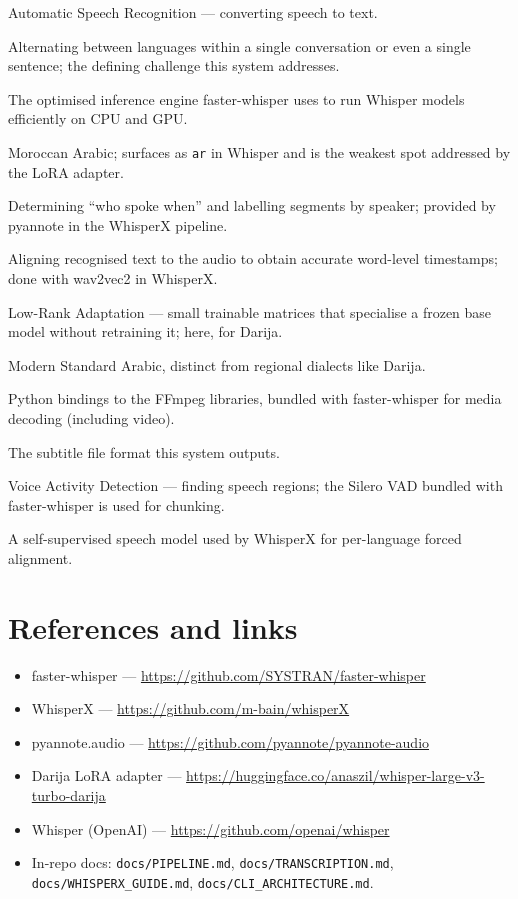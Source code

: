 \documentclass[11pt,a4paper]{report}
\newcommand{\code}[1]{\texttt{\small #1}}
\begin{document}
\begin{description}[leftmargin=2em,style=nextline]
  \item[ASR] Automatic Speech Recognition --- converting speech to text.
  \item[Code-switching] Alternating between languages within a single
        conversation or even a single sentence; the defining challenge this system
        addresses.
  \item[CTranslate2] The optimised inference engine faster-whisper uses to run
        Whisper models efficiently on CPU and GPU.
  \item[Darija] Moroccan Arabic; surfaces as \code{ar} in Whisper and is the
        weakest spot addressed by the LoRA adapter.
  \item[Diarization] Determining ``who spoke when'' and labelling segments by
        speaker; provided by pyannote in the WhisperX pipeline.
  \item[Forced alignment] Aligning recognised text to the audio to obtain accurate
        word-level timestamps; done with wav2vec2 in WhisperX.
  \item[LoRA] Low-Rank Adaptation --- small trainable matrices that specialise a
        frozen base model without retraining it; here, for Darija.
  \item[MSA] Modern Standard Arabic, distinct from regional dialects like Darija.
  \item[PyAV] Python bindings to the FFmpeg libraries, bundled with faster-whisper
        for media decoding (including video).
  \item[SRT / SubRip] The subtitle file format this system outputs.
  \item[VAD] Voice Activity Detection --- finding speech regions; the Silero VAD
        bundled with faster-whisper is used for chunking.
  \item[wav2vec2] A self-supervised speech model used by WhisperX for per-language
        forced alignment.
\end{description}

\section{References and links}

\begin{itemize}[leftmargin=1.6em]
  \item faster-whisper --- \url{https://github.com/SYSTRAN/faster-whisper}
  \item WhisperX --- \url{https://github.com/m-bain/whisperX}
  \item pyannote.audio --- \url{https://github.com/pyannote/pyannote-audio}
  \item Darija LoRA adapter --- \url{https://huggingface.co/anaszil/whisper-large-v3-turbo-darija}
  \item Whisper (OpenAI) --- \url{https://github.com/openai/whisper}
  \item In-repo docs: \texttt{docs/PIPELINE.md}, \texttt{docs/TRANSCRIPTION.md},
        \texttt{docs/WHISPERX\_GUIDE.md}, \texttt{docs/CLI\_ARCHITECTURE.md}.
\end{itemize}
\end{document}
